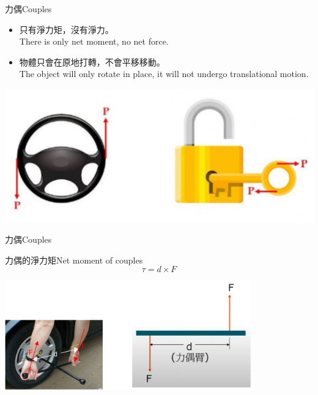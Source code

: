 \documentclass[beamer=true]{standalone}
\begin{document}
\begin{frame}{力偶Couples}
    \begin{itemize}
        \item 只有淨力矩，沒有淨力。\\There is only net moment, no net force.
        \item 物體只會在原地打轉，不會平移移動。\\The object will only rotate in place, it will not undergo translational motion.
    \end{itemize}\bigskip

    {\par\centering
        \includegraphics[width=.5\textwidth]{assets/88b4eb5e.png}
        \par}
\end{frame}
\begin{frame}{力偶Couples}
    \begin{alertblock}
        {力偶的淨力矩Net moment of couples}
        \begin{equation}
            \tau = d\times F
        \end{equation}
    \end{alertblock}

    {\par\centering
    \includegraphics[width=0.8\textwidth]{assets/9168cf9b.png}
    \par}
\end{frame}
\end{document}
